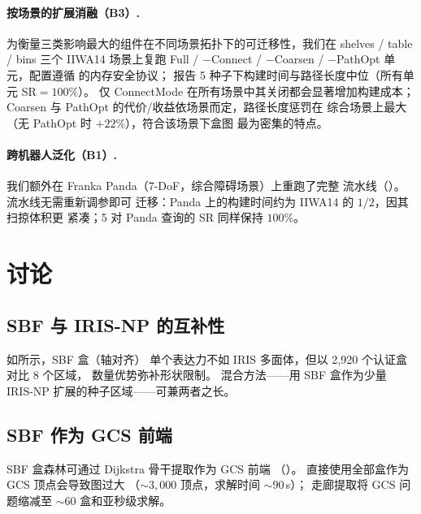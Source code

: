 \documentclass[journal]{IEEEtran}
\begin{document}

\paragraph{按场景的扩展消融（B3）.}
为衡量三类影响最大的组件在不同场景拓扑下的可迁移性，我们在
shelves / table / bins 三个 IIWA14 场景上复跑 Full / $-$Connect /
$-$Coarsen / $-$PathOpt 单元，配置遵循
 的内存安全协议；
报告 5 种子下构建时间与路径长度中位（所有单元 SR$=100\%$）。
仅 ConnectMode 在所有场景中其关闭都会显著增加构建成本；
Coarsen 与 PathOpt 的代价/收益依场景而定，路径长度惩罚在
综合场景上最大（无 PathOpt 时 $+22\%$），符合该场景下盒图
最为密集的特点。


\paragraph{跨机器人泛化（B1）.}
我们额外在 Franka Panda（$7$-DoF，综合障碍场景）上重跑了完整
流水线（）。流水线无需重新调参即可
迁移：Panda 上的构建时间约为 IIWA14 的 $1/2$，因其扫掠体积更
紧凑；5 对 Panda 查询的 SR 同样保持 $100\%$。


\section{讨论}\label{sec:discussion}

\subsection{SBF 与 IRIS-NP 的互补性}

如所示，SBF 盒（轴对齐）
单个表达力不如 IRIS 多面体，但以 2{,}920 个认证盒对比 8 个区域，
数量优势弥补形状限制。
混合方法——用 SBF 盒作为少量 IRIS-NP 扩展的种子区域——可兼两者之长。

\subsection{SBF 作为 GCS 前端}

SBF 盒森林可通过 Dijkstra 骨干提取作为 GCS 前端
（）。
直接使用全部盒作为 GCS 顶点会导致图过大
（${\sim}3{,}000$ 顶点，求解时间 ${\sim}90$\,s）；
走廊提取将 GCS 问题缩减至 ${\sim}60$ 盒和亚秒级求解。
\end{document}
